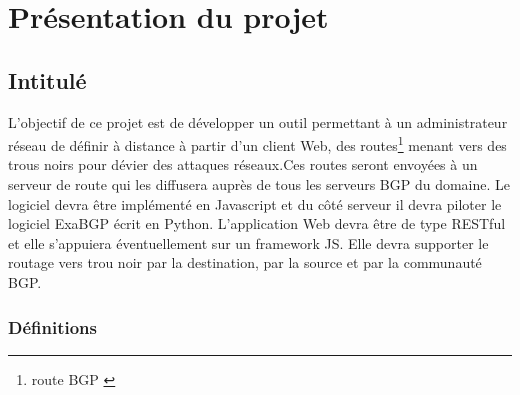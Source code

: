 \section{Présentation du projet}
\subsection{Intitulé}
 L'objectif de ce projet est de développer un outil permettant à un administrateur réseau de définir à distance à partir d'un client Web, des routes\footnote{route BGP \cite{BGP}} menant vers des trous noirs pour dévier des attaques réseaux.Ces routes seront envoyées à un serveur de route qui les diffusera auprès de tous les serveurs BGP du domaine. Le logiciel devra être implémenté en Javascript et du côté serveur il devra piloter le logiciel ExaBGP écrit en Python. L'application Web devra être de type RESTful et elle s'appuiera éventuellement sur un framework JS. Elle devra supporter le routage vers trou noir par la destination, par la source et par la communauté BGP.

\subsubsection{Définitions}

